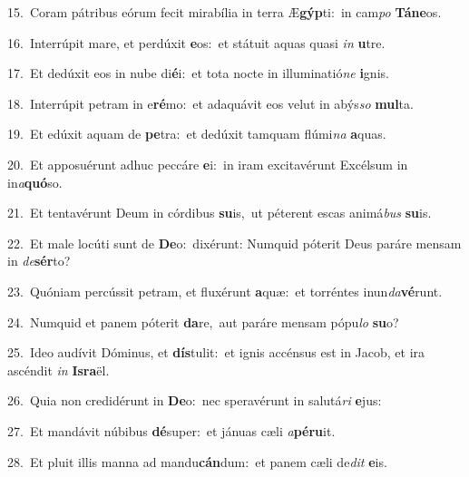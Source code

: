 {\numbfont\textcolor{\numbcolor}{15.}}~Coram pátribus eórum fecit mirabília in terra Æ\-\textbf{gýp}\-ti:~\star in cam\textit{po} \textbf{Tá}\-\textbf{ne}os.\par
{\numbfont\textcolor{\numbcolor}{16.}}~Interrúpit mare, et perdúxit \textbf{e}\-os:~\star et státuit aquas quasi \textit{in} \textbf{u}\-tre.\par
{\numbfont\textcolor{\numbcolor}{17.}}~Et dedúxit eos in nube di\-\textbf{é}\-i:~\star et tota nocte in illuminatió\textit{ne} \textbf{i}\-gnis.\par
{\numbfont\textcolor{\numbcolor}{18.}}~Interrúpit petram in e\-\textbf{ré}\-mo:~\star et adaquávit eos velut in abýs\textit{so} \textbf{mul}\-ta.\par
{\numbfont\textcolor{\numbcolor}{19.}}~Et edúxit aquam de \textbf{pe}\-tra:~\star et dedúxit tamquam flúmi\textit{na} \textbf{a}\-quas.\par
{\numbfont\textcolor{\numbcolor}{20.}}~Et apposuérunt adhuc peccáre \textbf{e}\-i:~\star in iram excitavérunt Excélsum in in\-\textit{a}\-\textbf{quó}so.\par
{\numbfont\textcolor{\numbcolor}{21.}}~Et tentavérunt Deum in córdibus \textbf{su}\-is,~\star ut péterent escas animá\textit{bus} \textbf{su}\-is.\par
{\numbfont\textcolor{\numbcolor}{22.}}~Et male locúti sunt de \textbf{De}\-o:~\star dixérunt: Numquid póterit Deus paráre mensam in \textit{de}\-\textbf{sér}to?\par
{\numbfont\textcolor{\numbcolor}{23.}}~Quóniam percússit petram, et fluxérunt \textbf{a}\-quæ:~\star et torréntes inun\-\textit{da}\-\textbf{vé}runt.\par
{\numbfont\textcolor{\numbcolor}{24.}}~Numquid et panem póterit \textbf{da}\-re,~\star aut paráre mensam pópu\textit{lo} \textbf{su}\-o?\par
{\numbfont\textcolor{\numbcolor}{25.}}~Ideo audívit Dóminus, et \textbf{dís}\-tulit:~\star et ignis accénsus est in Jacob, et ira ascéndit \textit{in} \textbf{Is}\-\textbf{ra}ël.\par
{\numbfont\textcolor{\numbcolor}{26.}}~Quia non credidérunt in \textbf{De}\-o:~\star nec speravérunt in salutá\textit{ri} \textbf{e}\-jus:\par
{\numbfont\textcolor{\numbcolor}{27.}}~Et mandávit núbibus \textbf{dé}\-super:~\star et jánuas cæli \textit{a}\-\textbf{pé}\textbf{ru}it.\par
{\numbfont\textcolor{\numbcolor}{28.}}~Et pluit illis manna ad mandu\-\textbf{cán}\-dum:~\star et panem cæli de\textit{dit} \textbf{e}\-is.\par
